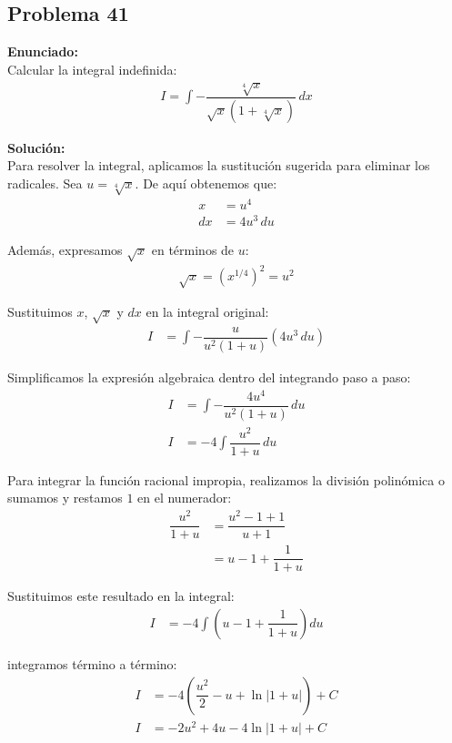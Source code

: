 \subsection*{Problema 41}

\textbf{Enunciado:} \\
Calcular la integral indefinida:
\begin{align*}
I = \int -\dfrac{\sqrt[4]{x}}{\sqrt{x}(1 + \sqrt[4]{x})} \, dx
\end{align*}

\textbf{Solución:} \\
Para resolver la integral, aplicamos la sustitución 
sugerida para eliminar los radicales. 
Sea $u = \sqrt[4]{x}$. De aquí obtenemos que:
\begin{align*}
x &= u^4 \\
dx &= 4u^3 \, du
\end{align*}

Además, expresamos $\sqrt{x}$ en términos de $u$:
\begin{align*}
\sqrt{x} = (x^{1/4})^2 = u^2
\end{align*}

Sustituimos $x$, $\sqrt{x}$ y $dx$ en la integral original:
\begin{align*}
I &= \int -\dfrac{u}{u^2 (1 + u)} (4u^3 \, du)
\end{align*}

Simplificamos la expresión algebraica dentro 
del integrando paso a paso:
\begin{align*}
I &= \int -\dfrac{4u^4}{u^2 (1 + u)} \, du \\
I &= -4 \int \dfrac{u^2}{1 + u} \, du
\end{align*}

Para integrar la función racional impropia, 
realizamos la división polinómica o sumamos 
y restamos $1$ en el numerador:
\begin{align*}
\dfrac{u^2}{1 + u} &= \dfrac{u^2 - 1 + 1}{u + 1} \\
&= u - 1 + \dfrac{1}{1 + u}
\end{align*}

Sustituimos este resultado en la integral:
\begin{align*}
I &= -4 \int \left( u - 1 + \dfrac{1}{1 + u} \right) du
\end{align*}

integramos término a término:
\begin{align*}
I &= -4 \left( \dfrac{u^2}{2} - u + \ln|1 + u| \right) + C \\
I &= -2u^2 + 4u - 4\ln|1 + u| + C
\end{align*}

